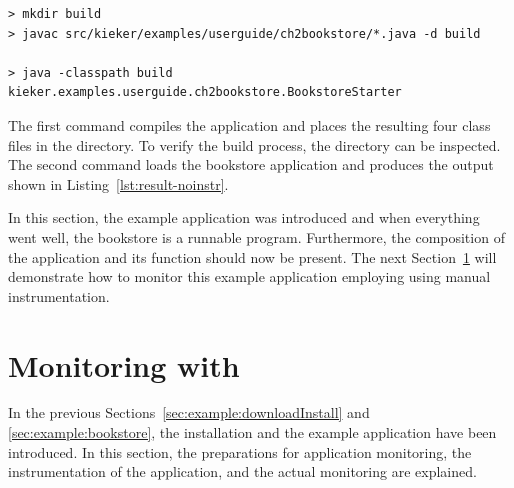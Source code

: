 \setBashListing
% 
\begin{lstlisting}[label=lst:bookstoreStarterNoInstr, caption=Commands to compile and run the Bookstore application]
> mkdir build
> javac src/kieker/examples/userguide/ch2bookstore/*.java -d build

> java -classpath build kieker.examples.userguide.ch2bookstore.BookstoreStarter
\end{lstlisting}

\noindent The first command compiles the application and places the resulting four class files in the  directory. To verify the build process, the  directory can be inspected. The second command loads the bookstore application and produces the output shown in Listing~\ref{lst:result-noinstr}.



\noindent In this section, the \Kieker{} example application was introduced and when everything went well, the bookstore is a runnable program. Furthermore, the composition of the application and its function should now be present. %
The next Section~\ref{sec:example:monitoring} will demonstrate how %
to monitor this example application employing \KiekerMonitoringPart{} using manual instrumentation.

\pagebreak

\section{Monitoring with \KiekerMonitoringPart{}}\label{sec:example:monitoring}

In the previous Sections~\ref{sec:example:downloadInstall} and \ref{sec:example:bookstore}, the \Kieker{} installation and the example application have been introduced. In this section, the preparations for application monitoring, the instrumentation of the application, and the actual monitoring are explained.

\quad\


